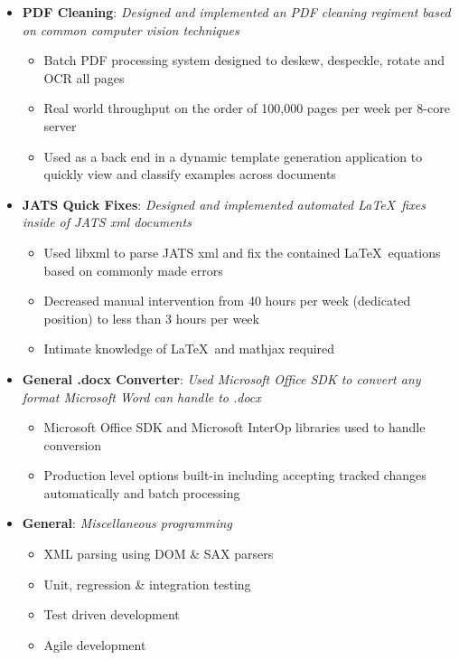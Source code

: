 \documentclass{article}
\newcommand{\ListItem}[2]{
	\item \small \textbf{#1}{: \it #2}
}
\begin{document}
\begin{itemize}[label=\faUsers]
\begin{itemize}[label=\faGears]
		\ListItem{PDF Cleaning}{Designed and implemented an PDF cleaning regiment based on common computer vision techniques}
		\begin{itemize}[label=\faGear]
			\item Batch PDF processing system designed to deskew, despeckle, rotate and OCR all pages
			\item Real world throughput on the order of 100,000 pages per week per 8-core server
			\item Used as a back end in a dynamic template generation application to quickly view and classify examples across documents
		\end{itemize}

		\ListItem{JATS Quick Fixes}{Designed and implemented automated \LaTeX\ fixes inside of JATS xml documents}
		\begin{itemize}[label=\faGear]
			\item Used libxml to parse JATS xml and fix the contained \LaTeX\ equations based on commonly made errors
			\item Decreased manual intervention from 40 hours per week (dedicated position) to less than 3 hours per week
			\item Intimate knowledge of \LaTeX\ and mathjax required
		\end{itemize}

		\ListItem{General .docx Converter}{Used Microsoft Office SDK to convert any format Microsoft Word can handle to .docx}
		\begin{itemize}[label=\faGear]
			\item Microsoft Office SDK and Microsoft InterOp libraries used to handle conversion
			\item Production level options built-in including accepting tracked changes automatically and batch processing
		\end{itemize}

		\ListItem{General}{Miscellaneous programming}
		\begin{itemize}[label=\faGear]
			\item XML parsing using DOM \& SAX parsers
			\item Unit, regression \& integration testing
           		\item Test driven development
			\item Agile development
		\end{itemize}

	\end{itemize}
	
	
	\vspace{1em}
	
\end{itemize}
\end{document}
